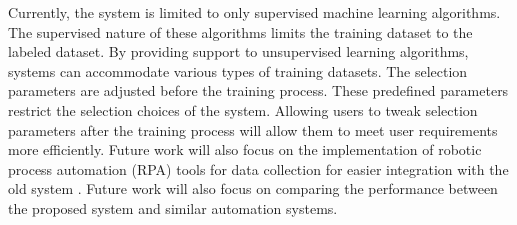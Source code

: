 \documentclass[a4paper,fleqn]{cas-dc}
\begin{document}
Currently, the system is limited to only supervised machine learning algorithms. The supervised nature of these algorithms limits the training dataset to the labeled dataset. By providing support to unsupervised learning algorithms, systems can accommodate various types of training datasets. The selection parameters are adjusted before the training process. These predefined parameters restrict the selection choices of the system. Allowing users to tweak selection parameters after the training process will allow them to meet user requirements more efficiently. Future work will also focus on the implementation of robotic process automation (RPA) tools for data collection for easier integration with the old system \cite{ref_paper_self_rpa}. Future work will also focus on comparing the performance between the proposed system and similar automation systems.









\end{document}
